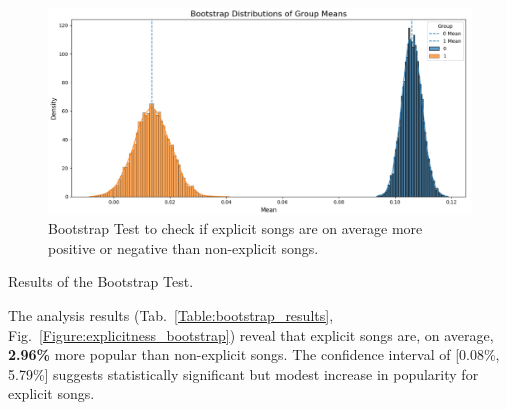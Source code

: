 \begin{center}
\begin{figure}[H]
  \centering
  \includegraphics[width=6in]{img/explicitness_bootstrap_2.png}
  \caption{Bootstrap Test to check if explicit songs are on average more
  positive or negative than non-explicit songs.}
  \label{Figure:explicitness_bootstrap_2}
\end{figure}
\end{center}



\begin{table}[H]
\centering
\caption{Results of the Bootstrap Test.}
\label{Table:bootstrap_results}
\end{table}

The analysis results (Tab.~\ref{Table:bootstrap_results},
Fig.~\ref{Figure:explicitness_bootstrap}) reveal that explicit songs are, on
average, \textbf{2.96\%} more popular than non-explicit songs. The confidence
interval of [0.08\%, 5.79\%] suggests statistically significant but modest
increase in popularity for explicit songs.

